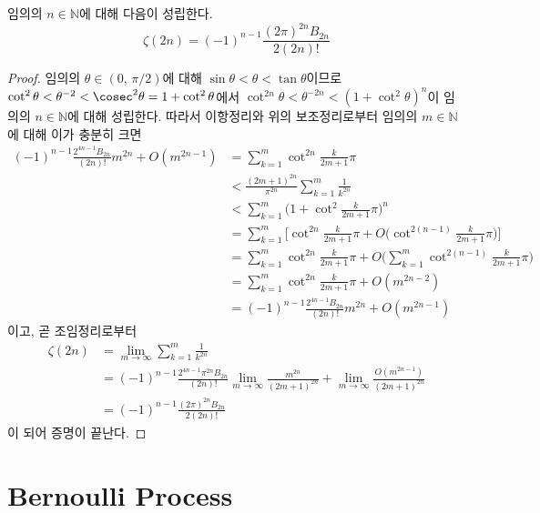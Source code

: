 \begin{theorem}
    임의의 $n\in\mathbb{N}$에 대해 다음이 성립한다.
    \begin{equation*}
        \zeta(2n)=(-1)^{n-1}\frac{(2\pi)^{2n}B_{2n}}{2(2n)!}
    \end{equation*}
\end{theorem}

\begin{proof}
    임의의 $\theta\in(0,\,\pi/2)$에 대해 $\sin\theta<\theta<\tan\theta$이므로 $\cot^2\theta<\theta^{-2}<\cosec^2\theta=1+\cot^2\theta$에서 $\cot^{2n}\theta<\theta^{-2n}<(1+\cot^2\theta)^n$이 임의의 $n\in\mathbb{N}$에 대해 성립한다. 따라서 이항정리와 위의 보조정리로부터 임의의 $m\in\mathbb{N}$에 대해 이가 충분히 크면
    \begin{align*}
        (-1)^{n-1}\frac{2^{4n-1}B_{2n}}{(2n)!}m^{2n}+O(m^{2n-1})&=\sum_{k=1}^m\cot^{2n}\frac{k}{2m+1}\pi\\
        &<\frac{(2m+1)^{2n}}{\pi^{2n}}\sum_{k=1}^m\frac{1}{k^{2n}}\\
        &<\sum_{k=1}^m\bigg(1+\cot^2\frac{k}{2m+1}\pi\bigg)^n\\
        &=\sum_{k=1}^m\bigg[\cot^{2n}\frac{k}{2m+1}\pi+O\bigg(\cot^{2(n-1)}\frac{k}{2m+1}\pi\bigg)\bigg]\\
        &=\sum_{k=1}^m\cot^{2n}\frac{k}{2m+1}\pi+O\bigg(\sum_{k=1}^m\cot^{2(n-1)}\frac{k}{2m+1}\pi\bigg)\\
        &=\sum_{k=1}^m\cot^{2n}\frac{k}{2m+1}\pi+O(m^{2n-2})\\
        &=(-1)^{n-1}\frac{2^{4n-1}B_{2n}}{(2n)!}m^{2n}+O(m^{2n-1})
    \end{align*}
    이고, 곧 조임정리로부터
    \begin{align*}
        \zeta(2n)&=\lim_{m\to\infty}\sum_{k=1}^m\frac{1}{k^{2n}}\\
        &=(-1)^{n-1}\frac{2^{4n-1}\pi^{2n}B_{2n}}{(2n)!}\lim_{m\to\infty}\frac{m^{2n}}{(2m+1)^{2n}}+\lim_{m\to\infty}\frac{O(m^{2n-1})}{(2m+1)^{2n}}\\
        &=(-1)^{n-1}\frac{(2\pi)^{2n}B_{2n}}{2(2n)!}
    \end{align*}
    이 되어 증명이 끝난다.
\end{proof}

\section{Bernoulli Process}

